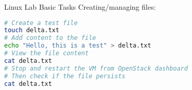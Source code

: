 \begin{example2}{Linux Lab Basic Tasks}
    Creating/managing files:
\begin{lstlisting}[language=bash, style=basesmol]
# Create a test file
touch delta.txt
# Add content to the file
echo "Hello, this is a test" > delta.txt
# View the file content
cat delta.txt
# Stop and restart the VM from OpenStack dashboard
# Then check if the file persists
cat delta.txt
\end{lstlisting}
\end{example2}

\multend
